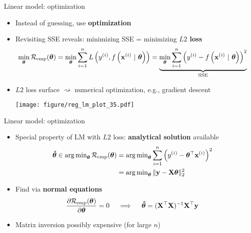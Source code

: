 \documentclass[11pt,compress,t,notes=noshow, xcolor=table]{beamer}
\begin{document}
\begin{vbframe}{Linear model: optimization}

\begin{itemize}
    \item Instead of guessing, use \textbf{optimization}
    \item Revisiting SSE reveals: minimizing SSE = minimizing 
    \textbf{$L2$ loss} 
    \footnotesize
    \begin{align*}
        \min_{\bm{\theta}} \mathcal{R}_{\text{emp}}(\bm{\theta}) = \min_{\bm{\theta}} \sum\limits_{i=1}^n L\left(y^{(i)}, f\left(\mathbf{x}^{(i)} ~|~ \bm{\theta}\right)\right) = 
        \underbrace{\min_{\bm{\theta}} \sum\limits_{i=1}^n \left(y^{(i)} - f\left(\mathbf{x}^{(i)} ~|~ \bm{\theta}\right)\right)^2}_{
        \text{SSE}}
    \end{align*}
    \normalsize
    \item $L2$ loss surface $\rightsquigarrow$ numerical optimization, e.g.,
    gradient descent
    
    \texttt{[image: figure/reg\_lm\_plot\_35.pdf]}
\end{itemize}

\end{vbframe}


\begin{vbframe}{Linear model: optimization}

\begin{itemize}
    \item Special property of LM with $L2$ loss: \textbf{analytical solution}
    available
    \begin{align*}
        \bm{\hat\theta} \in 
        \operatorname{arg\,min}_{\bm{\theta}} \mathcal{R}_{\text{emp}}(\bm{\theta}) &=
        \operatorname{arg\,min}_{\bm{\theta}} \sum\limits_{i=1}^n \left(y^{(i)} - \bm{\theta}^\top \mathbf{x}^{(i)} \right)^2  \\
        &= \operatorname{arg\,min}_{\bm{\theta}} \| \mathbf{y} - \mathbf{X} \bm{\theta} \|^2_2
    \end{align*}
    \normalsize
    \item Find via \textbf{normal equations}
    $$
    \frac{\partial{\mathcal{R}_{\text{emp}}(\bm{\theta})}}{\partial \bm{\theta}} = 0 \quad\implies\quad \bm{\hat\theta} = (\mathbf{X}^\top \mathbf{X})^{-1} \mathbf{X}^\top \mathbf{y}
    $$
    \item Matrix inversion possibly expensive (for large $n$)
\end{itemize}

\end{vbframe}


\endlecture
\end{document}
